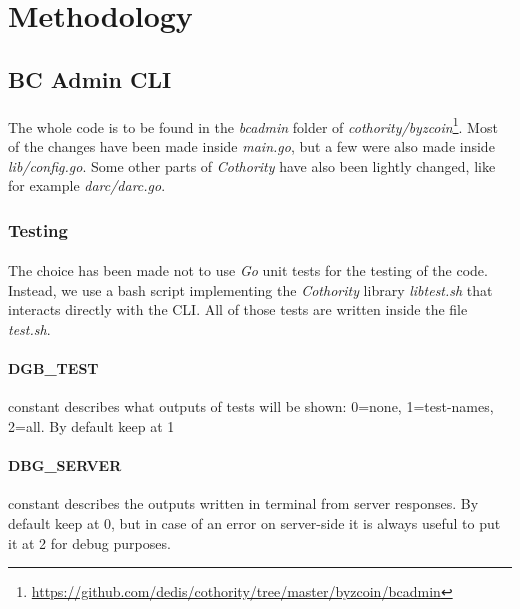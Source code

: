 \section{Methodology}

\subsection{BC Admin CLI}

\paragraph{}

The whole code is to be found in the \textit{bcadmin} folder of \textit{cothority/byzcoin}\footnote{\url{https://github.com/dedis/cothority/tree/master/byzcoin/bcadmin}}. Most of the changes have been made inside \textit{main.go}, but a few were also made inside \textit{lib/config.go}. Some other parts of \textit{Cothority} have also been lightly changed, like for example \textit{darc/darc.go}.

\subsubsection{Testing}

\paragraph{}

The choice has been made not to use \textit{Go} unit tests for the testing of the code. Instead, we use a bash script implementing the \textit{Cothority} library \textit{libtest.sh} that interacts directly with the CLI. All of those tests are written inside the file \textit{test.sh}.

\paragraph{DGB\_TEST} constant describes what outputs of tests will be shown: 0=none, 1=test-names, 2=all. By default keep at 1

\paragraph{DBG\_SERVER} constant describes the outputs written in terminal from server responses. By default keep at 0, but in case of an error on server-side it is always useful to put it at 2 for debug purposes.

